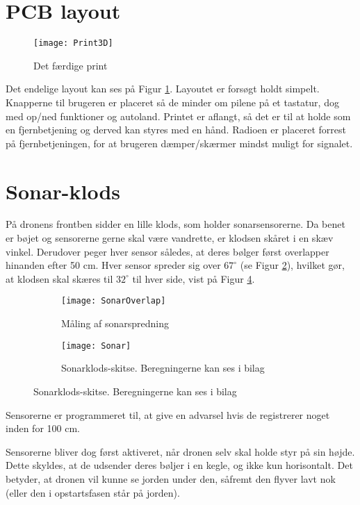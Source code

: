 \documentclass[Main]{subfiles}
\begin{document}
\section{PCB layout}

\begin{figure}[H]
\centering
\texttt{[image: Print3D]}
\caption{Det færdige print}
\label{fig: Print3D}
\end{figure}
Det endelige layout kan ses på Figur \ref{fig: Print3D}.
Layoutet er forsøgt holdt simpelt. 
Knapperne til brugeren er placeret så de minder om pilene på et tastatur, dog med op/ned funktioner og autoland.
Printet er aflangt, så det er til at holde som en fjernbetjening og derved kan styres med en hånd.
Radioen er placeret forrest på fjernbetjeningen, for at brugeren dæmper/skærmer mindst muligt for signalet.  


\newpage
\section{Sonar-klods}\label{Sec:Sonar}
På dronens frontben sidder en lille klods, som holder sonarsensorerne.
Da benet er bøjet og sensorerne gerne skal være vandrette, er klodsen skåret i en skæv vinkel.
Derudover peger hver sensor således, at deres bølger først overlapper hinanden efter 50 cm.
Hver sensor spreder sig over $67^\circ$ (se Figur \ref{Fig:SonarMeasure}), hvilket gør, at klodsen skal skæres til $32^\circ$ til hver side, vist på Figur \ref{Fig:SonarSkitse}.
\begin{figure}[H]
\centering
	\begin{subfigure}[b]{0.45\textwidth}
		\texttt{[image: SonarOverlap]}
		\caption{Måling af sonarspredning}
		\label{Fig:SonarMeasure}
	\end{subfigure}
	\quad
	\begin{subfigure}[b]{0.45\textwidth}
	\centering
		\texttt{[image: Sonar]}
		\caption{Sonarklods-skitse. Beregningerne kan ses i bilag\cite{Klods}}
		\label{Fig:SonarSkitse}
	\end{subfigure}
\end{figure}

Sensorerne er programmeret til, at give en advarsel hvis de registrerer noget inden for 100 cm.

Sensorerne bliver dog først aktiveret, når dronen selv skal holde styr på sin højde. Dette skyldes, at de udsender deres bøljer i en kegle, og ikke kun horisontalt. 
Det betyder, at dronen vil kunne se jorden under den, såfremt den flyver lavt nok (eller den i opstartsfasen står på jorden).
\end{document}
